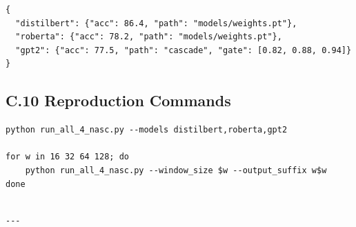 \begin{lstlisting}
{
  "distilbert": {"acc": 86.4, "path": "models/weights.pt"},
  "roberta": {"acc": 78.2, "path": "models/weights.pt"},
  "gpt2": {"acc": 77.5, "path": "cascade", "gate": [0.82, 0.88, 0.94]}
}
\end{lstlisting}

\subsection{C.10 Reproduction Commands}

\begin{lstlisting}
python run_all_4_nasc.py --models distilbert,roberta,gpt2

for w in 16 32 64 128; do
    python run_all_4_nasc.py --window_size $w --output_suffix w$w
done
\end{lstlisting}
\begin{lstlisting}

---
\end{lstlisting}